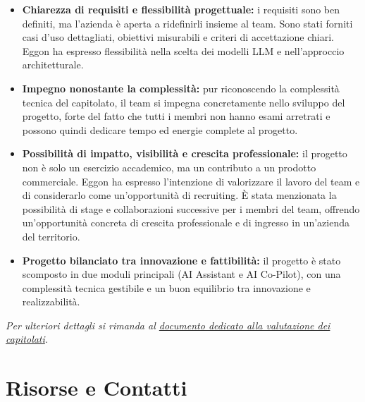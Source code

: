 \documentclass[a4paper,11pt]{article}
\begin{document}
\begin{itemize}
    \item \textbf{Chiarezza di requisiti e flessibilità progettuale:} i requisiti sono ben definiti, ma l'azienda è aperta a ridefinirli insieme al team. Sono stati forniti casi d'uso dettagliati, obiettivi misurabili e criteri di accettazione chiari. Eggon ha espresso flessibilità nella scelta dei modelli LLM e nell'approccio architetturale.

    \item \textbf{Impegno nonostante la complessità:} pur riconoscendo la complessità tecnica del capitolato, il team si impegna concretamente nello sviluppo del progetto, forte del fatto che tutti i membri non hanno esami arretrati e possono quindi dedicare tempo ed energie complete al progetto.
    
    \item \textbf{Possibilità di impatto, visibilità e crescita professionale:} il progetto non è solo un esercizio accademico, ma un contributo a un prodotto commerciale. Eggon ha espresso l'intenzione di valorizzare il lavoro del team e di considerarlo come un'opportunità di recruiting. È stata menzionata la possibilità di stage e collaborazioni successive per i membri del team, offrendo un'opportunità concreta di crescita professionale e di ingresso in un'azienda del territorio.
    
    \item \textbf{Progetto bilanciato tra innovazione e fattibilità:} il progetto è stato scomposto in due moduli principali (AI Assistant e AI Co-Pilot), con una complessità tecnica gestibile e un buon equilibrio tra innovazione e realizzabilità.
\end{itemize}


\vspace{1em}

\begin{tcolorbox}[
    colback=lightgray,
    colframe=secondarycolor,
    arc=2mm,
    boxrule=0pt,
    left=10pt,
    right=10pt,
    top=8pt,
    bottom=8pt
]
    \small\textit{Per ulteriori dettagli si rimanda al \href{https://bugbustersunipd.github.io/BugBusterSite/assets/docs/SCELTA_CAPITOLATO/Resoconto_capitolati.pdf}{documento dedicato alla valutazione dei capitolati}.}
\end{tcolorbox}


\section*{Risorse e Contatti}
\end{document}
